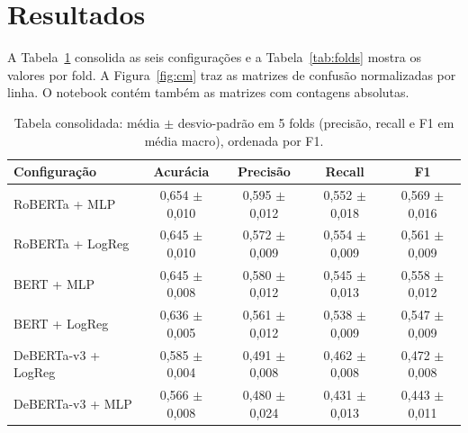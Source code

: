 \documentclass[11pt,a4paper]{article}
\begin{document}
\section{Resultados}

A Tabela~\ref{tab:consolidada} consolida as seis configurações e a Tabela~\ref{tab:folds} mostra os valores por fold. A Figura~\ref{fig:cm} traz as matrizes de confusão normalizadas por linha. O notebook contém também as matrizes com contagens absolutas.

\begin{table}[H]
\centering
\caption{Tabela consolidada: média $\pm$ desvio-padrão em 5 folds (precisão, recall e F1 em média macro), ordenada por F1.}
\label{tab:consolidada}
\begin{tabular}{lcccc}
\toprule
Configuração & Acurácia & Precisão & Recall & F1 \\
\midrule
RoBERTa + MLP       & 0,654 $\pm$ 0,010 & 0,595 $\pm$ 0,012 & 0,552 $\pm$ 0,018 & 0,569 $\pm$ 0,016 \\
RoBERTa + LogReg    & 0,645 $\pm$ 0,010 & 0,572 $\pm$ 0,009 & 0,554 $\pm$ 0,009 & 0,561 $\pm$ 0,009 \\
BERT + MLP          & 0,645 $\pm$ 0,008 & 0,580 $\pm$ 0,012 & 0,545 $\pm$ 0,013 & 0,558 $\pm$ 0,012 \\
BERT + LogReg       & 0,636 $\pm$ 0,005 & 0,561 $\pm$ 0,012 & 0,538 $\pm$ 0,009 & 0,547 $\pm$ 0,009 \\
DeBERTa-v3 + LogReg & 0,585 $\pm$ 0,004 & 0,491 $\pm$ 0,008 & 0,462 $\pm$ 0,008 & 0,472 $\pm$ 0,008 \\
DeBERTa-v3 + MLP    & 0,566 $\pm$ 0,008 & 0,480 $\pm$ 0,024 & 0,431 $\pm$ 0,013 & 0,443 $\pm$ 0,011 \\
\bottomrule
\end{tabular}
\end{table}
\end{document}
